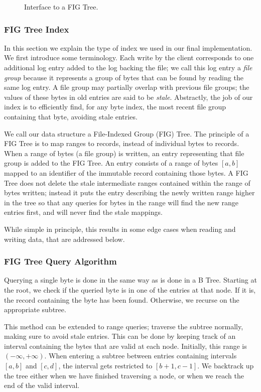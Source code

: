 \documentclass{acm_proc_article-sp}
\begin{document}
\lstset{
    frame=single,
    breaklines=true,
}
\begin{figure}[t]

\caption{Interface to a FIG Tree.}
\end{figure}

\subsubsection{FIG Tree Index}
In this section we explain the type of index we used in our final implementation. We first introduce some terminology. Each write by the client corresponds to one additional log entry added to the log backing the file; we call this log entry a \emph{file group} because it represents a group of bytes that can be found by reading the same log entry. A file group may partially overlap with previous file groups; the values of these bytes in old entries are said to be \emph{stale}. Abstractly, the job of our index is to efficiently find, for any byte index, the most recent file group containing that byte, avoiding stale entries.

We call our data structure a File-Indexed Group (FIG) Tree. The principle of a FIG Tree is to map ranges to records, instead of individual bytes to records. When a range of bytes (a file group) is written, an entry representing that file group is added to the FIG Tree. An entry consists of a range of bytes $[a, b]$ mapped to an identifier of the immutable record containing those bytes. A FIG Tree does not delete the stale intermediate ranges contained within the range of bytes written; instead it puts the entry describing the newly written range higher in the tree so that any queries for bytes in the range will find the new range entries first, and will never find the stale mappings.

While simple in principle, this results in some edge cases when reading and writing data, that are addressed below.

\subsubsection{FIG Tree Query Algorithm}
Querying a single byte is done in the same way as is done in a B Tree. Starting at the root, we check if the queried byte is in one of the entries at that node. If it is, the record containing the byte has been found. Otherwise, we recurse on the appropriate subtree.

This method can be extended to range queries; traverse the subtree normally, making sure to avoid stale entries. This can be done by keeping track of an interval containing the bytes that are valid at each node. Initially, this range is $(-\infty, +\infty)$. When entering a subtree between entries containing intervals $[a, b]$ and $[c, d]$, the interval gets restricted to $[b + 1, c - 1]$. We backtrack up the tree either when we have finished traversing a node, or when we reach the end of the valid interval.
\end{document}
